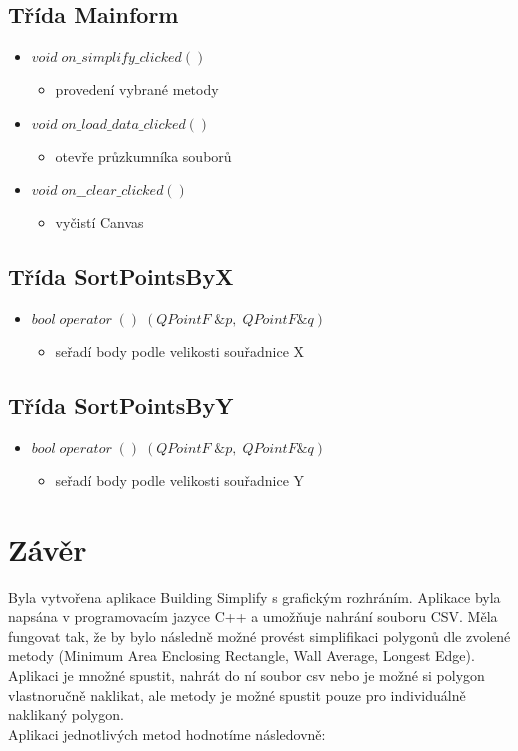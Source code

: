 \documentclass[oneside,12pt,a4paper]{book}
\begin{document}
   \section{Třída Mainform}
    \begin{itemize}
    \item $void \;on\_simplify\_clicked()$
    \begin{itemize}
\item provedení vybrané metody
\end{itemize}
    \item $void\; on\_load\_data\_clicked()$
    \begin{itemize}
\item otevře průzkumníka souborů
\end{itemize}
    \item $void \;on\_\_clear\_clicked()$
    \begin{itemize}
\item vyčistí Canvas
\end{itemize}
\end{itemize}

\section{Třída SortPointsByX}
    \begin{itemize}
    \item $bool\; operator\; ()\; (QPointF\; \&p,\; QPointF \&q)$
    \begin{itemize}
    \item seřadí body podle velikosti souřadnice X
    \end{itemize}
    \end{itemize}

\section{Třída SortPointsByY}
    \begin{itemize}
    \item $bool\; operator\; ()\; (QPointF\; \&p,\; QPointF \&q)$
    \begin{itemize}
    \item seřadí body podle velikosti souřadnice Y
    \end{itemize}
    \end{itemize}


\chapter{Závěr} 
Byla vytvořena aplikace Building Simplify s grafickým rozhráním. Aplikace byla napsána v programovacím jazyce C++ a umožňuje nahrání souboru CSV. Měla fungovat tak, že by bylo následně možné provést simplifikaci polygonů dle zvolené metody (Minimum Area Enclosing Rectangle, Wall Average, Longest Edge).
Aplikaci je množné spustit, nahrát do ní soubor csv nebo je možné si polygon vlastnoručně naklikat, ale metody je možné spustit pouze pro individuálně naklikaný polygon.
\\
Aplikaci jednotlivých metod hodnotíme následovně$:$
  
\end{document}
